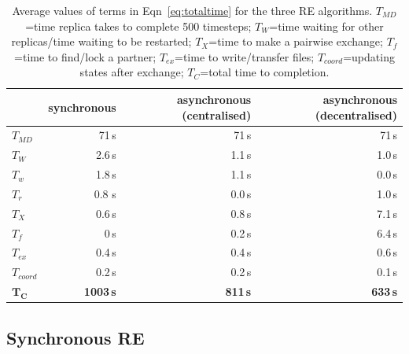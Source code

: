 \documentclass{rspublic}
\newcommand{\alnote}[1]{ {\textcolor{blue} { ***andre: #1 }}}
\newcommand{\athotanote}[1]{ {\textcolor{green} { ***athota: #1 }}}
\newcommand{\alnote}[1]{}
\newcommand{\athotanote}[1]{}
\begin{document}
\begin{table}
    \centering
	\begin{tabular}{|l|r|r|r|}
	\hline
	                        &\textbf{synchronous}  &\textbf{asynchronous (centralised)} 
	                        &\textbf{asynchronous (decentralised)}\\
	\hline
	\hline
	$T_{MD}$       &71\,s &71\,s &71\,s\\
	\hline
	\hline
	$T_{W}$        &2.6\,s &1.1\,s &1.0\,s\\
    \hline
    \hspace{2mm}$T_{w}$ &1.8\,s &1.1\,s &0.0\,s\\ 
    \hline
    \hspace{2mm}$T_{r}$ &0.8 s&0.0\,s &1.0\,s\\
	\hline\hline
	$T_{X}$        &0.6\,s &0.8\,s &7.1\,s\\
	\hline
	\hspace{2mm}$T_{f}$        &0\,s   &0.2\,s &6.4\,s\\
	\hline
	\hspace{2mm}$T_{ex}$       &0.4\,s &0.4\,s &0.6\,s\\
	\hline
    \hspace{2mm}$T_{coord}$    &0.2\,s &0.2\,s  &0.1\,s\\
	\hline
	\hline
	$\mathbf{T_{C}}$        &\textbf{1003\,s} &\textbf{811\,s}    &\textbf{633\,s}\\
	\hline
    \end{tabular}
    \caption{Average values of terms in Eqn~\ref{eq:totaltime} for the three RE algorithms. $T_{MD}$=time replica takes to complete 500 timesteps; $T_W$=time waiting for other replicas/time waiting to be restarted; $T_X$=time to make a pairwise exchange; $T_f$=time to find/lock a partner; $T_{ex}$=time to write/transfer files; $T_{coord}$=updating states after exchange; $T_C$=total time to completion. }
	\label{table:repex_perf}
\end{table}

\subsection{Synchronous RE}
\label{sec:impl_sync_re}
\end{document}
